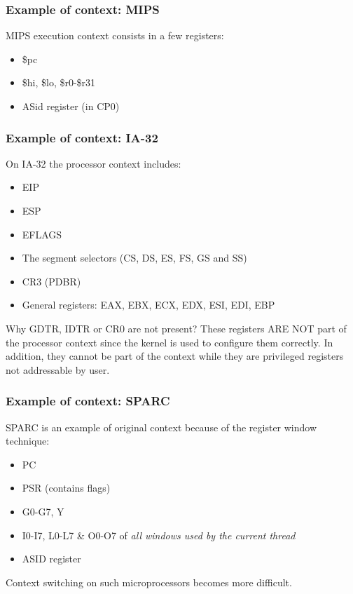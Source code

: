 
\begin{frame}
  \frametitle{Example of context: MIPS}

  MIPS execution context consists in a few registers:

  \begin{itemize}
  \item
    \$pc
  \item
    \$hi, \$lo, \$r0-\$r31
  \item
    ASid register (in CP0)
  \end{itemize}

\end{frame}


\begin{frame}
  \frametitle{Example of context: IA-32}

  On IA-32 the processor context includes:

  \begin{itemize}
  \item
    EIP
  \item
    ESP
  \item
    EFLAGS
  \item
    The segment selectors (CS, DS, ES, FS, GS and SS)
  \item
    CR3 (PDBR)
  \item
    General registers: EAX, EBX, ECX, EDX, ESI, EDI, EBP
  \end{itemize}

  \-

  Why GDTR, IDTR or CR0 are not present? These registers ARE NOT part
  of the processor context since the kernel is used to configure them
  correctly. In addition, they cannot be part of the context while
  they are privileged registers not addressable by user.

\end{frame}


\begin{frame}
  \frametitle{Example of context: SPARC}

  SPARC is an example of original context because of the register
  window technique:

  \begin{itemize}
  \item
    PC
  \item
    PSR (contains flags)
  \item
    G0-G7, Y
  \item
    I0-I7, L0-L7 \& O0-O7 of \emph{all windows used by the current thread}
  \item
    ASID register
  \end{itemize}

  \-

  Context switching on such microprocessors becomes more difficult.

\end{frame}

